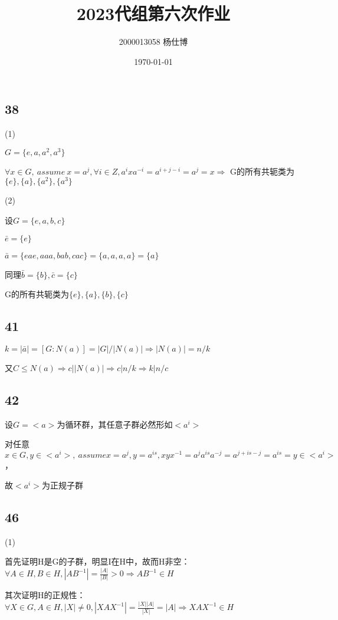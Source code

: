 \documentclass[UTF8]{ctexart}
\title{\vspace{-4cm}2023代组第六次作业}
\author{2000013058 杨仕博}
\date{\today}
\begin{document}
\maketitle

\subsection*{38}

(1)

$G = \{e, a, a^2, a^3\}$

$\forall x\in G,\ assume\ x = a^j, \forall i\in Z, a^ixa^{-i} = a^{i+j-i} = a^j = x\Rightarrow$
G的所有共轭类为$\{e\}, \{a\}, \{a^2\}, \{a^3\}$

(2)

设$G = \{e, a, b, c\}$

$\bar{e} = \{e\}$

$\bar{a} = \{eae, aaa, bab, cac\} = \{a, a, a, a\} = \{a\}$

同理$\bar{b} = \{b\}, \bar{c} = \{c\}$

G的所有共轭类为$\{e\}, \{a\}, \{b\}, \{c\}$

\subsection*{41}

$k = |\bar{a}| = [G: N(a)] = |G| / |N(a)| \Rightarrow|N(a)| = n/k$

又$C\leq N(a)\Rightarrow c \Big| |N(a)|\Rightarrow c\Big| n / k\Rightarrow k\Big| n / c$

\subsection*{42}

设$G = <a>$为循环群，其任意子群必然形如$<a^i>$

对任意$x\in G, y\in <a^i>,\ assume x = a^j, y = a^{is}, xyx^{-1} = a^ja^{is}a^{-j} = a^{j + is - j} = a^{is} = y \in <a^i>$，

故$<a^i>$为正规子群

\subsection*{46}

(1)

首先证明H是G的子群，明显I在H中，故而H非空：$\forall A\in H, B\in H, |AB^{-1}| = \frac{|A|}{|B|} > 0\Rightarrow AB^{-1}\in H$

其次证明H的正规性：$\forall X\in G, A\in H, |X|\neq 0, |XAX^{-1}| = \frac{|X||A|}{|X|} = |A|\Rightarrow XAX^{-1}\in H$
\end{document}
